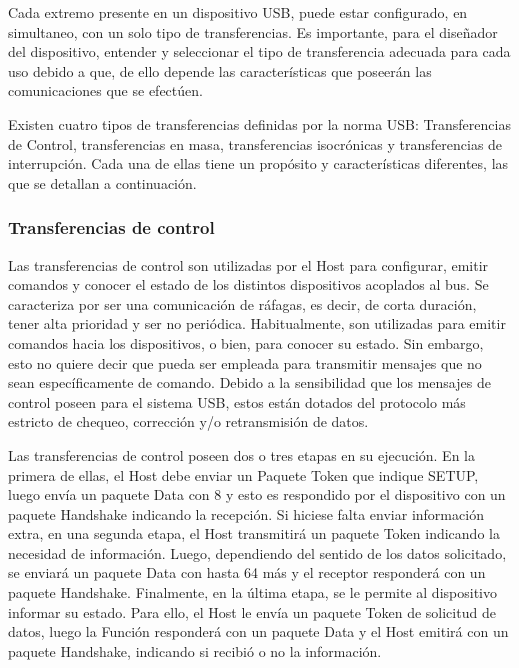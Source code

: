Cada extremo presente en un dispositivo USB, puede estar configurado, en simultaneo, con un solo tipo de transferencias. Es importante, para el diseñador del dispositivo, entender y seleccionar el tipo de transferencia adecuada para cada uso debido a que, de ello depende las características que poseerán las comunicaciones que se efectúen.%

Existen cuatro tipos de transferencias definidas por la norma USB: Transferencias de Control, transferencias en masa, transferencias isocrónicas y transferencias de interrupción. Cada una de ellas tiene un propósito y características diferentes, las que se detallan a continuación.

\subsubsection{Transferencias de control}
	
	Las transferencias de control son utilizadas por el Host para configurar, emitir comandos y conocer el estado de los distintos dispositivos acoplados al bus. Se caracteriza por ser una comunicación de ráfagas, es decir, de corta duración, tener alta prioridad y ser no periódica. Habitualmente, son utilizadas para emitir comandos hacia los dispositivos, o bien, para conocer su estado. Sin embargo, esto no quiere decir que pueda ser empleada para transmitir mensajes que no sean específicamente de comando. Debido a la sensibilidad que los mensajes de control poseen para el sistema USB, estos están dotados del protocolo más estricto de chequeo, corrección y/o retransmisión de datos.%
	
	Las transferencias de control poseen dos o tres etapas en su ejecución. En la primera de ellas, el Host debe enviar un Paquete Token que indique SETUP, luego envía un paquete Data con \SI{8}{\byte} y esto es respondido por el dispositivo con un paquete Handshake indicando la recepción. Si hiciese falta enviar información extra, en una segunda etapa, el Host transmitirá un paquete Token indicando la necesidad de información. Luego, dependiendo del sentido de los datos solicitado, se enviará un paquete Data con hasta \SI{64}{\byte} más y el receptor responderá con un paquete Handshake. Finalmente, en la última etapa, se le permite al dispositivo informar su estado. Para ello, el Host le envía un paquete Token de solicitud de datos, luego la Función responderá con un paquete Data y el Host emitirá con un paquete Handshake, indicando si recibió o no la información.
	
